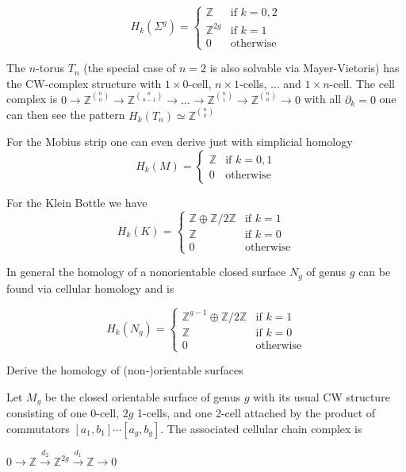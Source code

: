 \[ H_k(\Sigma^g) = 
\begin{cases} 
\mathbb{Z} & \text{if } k = 0,2 \\
\mathbb{Z}^{2g} & \text{if } k = 1 \\
0 & \text{otherwise}
\end{cases} \]

The \( n \)-torus \( T_n \) (the special case of \( n = 2 \) is also solvable via Mayer-Vietoris)
has the CW-complex structure with \( 1 \times 0 \)-cell, \( n \times 1 \)-cells, \( \dots \) and \( 1 \times n\)-cell.
The cell complex is
\( 0 \to \mathbb{Z}^\binom{n}{n} \to \mathbb{Z}^\binom{n}{n-1} \to \dots \to \mathbb{Z}^\binom{n}{1} \to \mathbb{Z}^\binom{n}{0} \to 0\)
with all \( \partial_k = 0 \) one can then see the pattern
\( H_k(T_n) \simeq \mathbb{Z}^\binom{n}{k}\)

For the Mobius strip one can even derive just with simplicial homology
\[ H_k(M) = 
\begin{cases} 
\mathbb{Z} & \text{if } k = 0,1 \\
0 & \text{otherwise}
\end{cases} \]

For the Klein Bottle we have
\[ H_k(K) = 
\begin{cases} 
\mathbb{Z} \oplus \mathbb{Z}/2\mathbb{Z} & \text{if } k = 1 \\
\mathbb{Z} & \text{if } k = 0 \\
0 & \text{otherwise}
\end{cases} \]

In general the homology of a nonorientable closed surface \( N_g \) of genus \( g \) can be found via cellular homology
and is

\[ H_k(N_g) = 
\begin{cases} 
\mathbb{Z}^{g-1} \oplus \mathbb{Z}/2\mathbb{Z} & \text{if } k = 1 \\
\mathbb{Z} & \text{if } k = 0 \\
0 & \text{otherwise}
\end{cases} \]



Derive the homology of (non-)orientable surfaces

Let \(M_g\) be the closed orientable surface of genus \(g\) with its usual CW structure consisting of one 0-cell, \(2g\) 1-cells, 
and one 2-cell attached by the product of commutators \([a_1, b_1] \dotsm [a_g, b_g]\). The associated cellular chain complex is

\(0 \longrightarrow \mathbb{Z} \xrightarrow{d_2} \mathbb{Z}^{2g} \xrightarrow{d_1} \mathbb{Z} \longrightarrow 0\)

